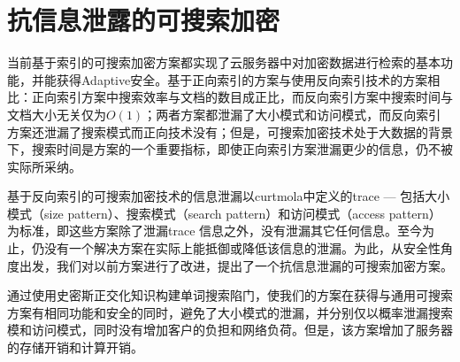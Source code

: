 
\chapter{抗信息泄露的可搜索加密}
\label{chap:searchpattern}

当前基于索引的可搜索加密方案都实现了云服务器中对加密数据进行检索的基本功能，并能获得Adaptive安全。基于正向索引的方案与使用反向索引技术的方案相比：正向索引方案中搜索效率与文档的数目成正比，而反向索引方案中搜索时间与文档大小无关仅为$O(1)$；两者方案都泄漏了大小模式和访问模式，而反向索引方案还泄漏了搜索模式而正向技术没有；但是，可搜索加密技术处于大数据的背景下，搜索时间是方案的一个重要指标，即使正向索引方案泄漏更少的信息，仍不被实际所采纳。

基于反向索引的可搜索加密技术的信息泄漏以curtmola\cite{curtmola2006searchable}中定义的trace --- 包括大小模式（size pattern）、搜索模式（search pattern）和访问模式（access pattern）为标准，即这些方案除了泄漏trace 信息之外，没有泄漏其它任何信息。至今为止，仍没有一个解决方案在实际上能抵御或降低该信息的泄漏。为此，从安全性角度出发，我们对以前方案进行了改进，提出了一个抗信息泄漏的可搜索加密方案。

通过使用史密斯正交化知识构建单词搜索陷门，使我们的方案在获得与通用可搜索方案有相同功能和安全的同时，避免了大小模式的泄漏，并分别仅以概率泄漏搜索模和访问模式，同时没有增加客户的负担和网络负荷。但是，该方案增加了服务器的存储开销和计算开销。







